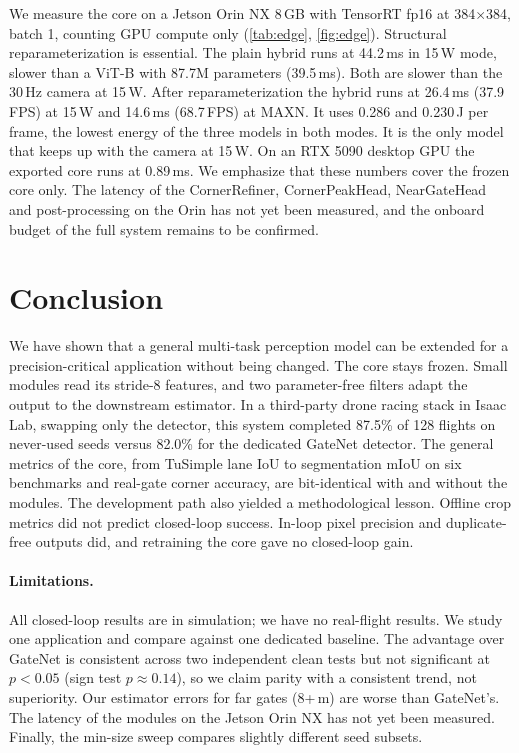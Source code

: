 \documentclass[10pt,twocolumn,letterpaper]{article}
\begin{document}
We measure the core on a Jetson Orin NX 8\,GB with TensorRT fp16 at 384$\times$384, batch 1, counting GPU compute only (\cref{tab:edge}, \cref{fig:edge}). Structural reparameterization is essential. The plain hybrid runs at 44.2\,ms in 15\,W mode, slower than a ViT-B with 87.7M parameters (39.5\,ms). Both are slower than the 30\,Hz camera at 15\,W. After reparameterization the hybrid runs at 26.4\,ms (37.9\,FPS) at 15\,W and 14.6\,ms (68.7\,FPS) at MAXN. It uses 0.286 and 0.230\,J per frame, the lowest energy of the three models in both modes. It is the only model that keeps up with the camera at 15\,W. On an RTX 5090 desktop GPU the exported core runs at 0.89\,ms. We emphasize that these numbers cover the frozen core only. The latency of the CornerRefiner, CornerPeakHead, NearGateHead and post-processing on the Orin has not yet been measured, and the onboard budget of the full system remains to be confirmed.

\section{Conclusion}
\label{sec:conclusion}
We have shown that a general multi-task perception model can be extended for a precision-critical application without being changed. The core stays frozen. Small modules read its stride-8 features, and two parameter-free filters adapt the output to the downstream estimator. In a third-party drone racing stack in Isaac Lab, swapping only the detector, this system completed 87.5\% of 128 flights on never-used seeds versus 82.0\% for the dedicated GateNet detector. The general metrics of the core, from TuSimple lane IoU to segmentation mIoU on six benchmarks and real-gate corner accuracy, are bit-identical with and without the modules. The development path also yielded a methodological lesson. Offline crop metrics did not predict closed-loop success. In-loop pixel precision and duplicate-free outputs did, and retraining the core gave no closed-loop gain.

\paragraph{Limitations.}
All closed-loop results are in simulation; we have no real-flight results. We study one application and compare against one dedicated baseline. The advantage over GateNet is consistent across two independent clean tests but not significant at $p<0.05$ (sign test $p\approx0.14$), so we claim parity with a consistent trend, not superiority. Our estimator errors for far gates (8+\,m) are worse than GateNet's. The latency of the modules on the Jetson Orin NX has not yet been measured. Finally, the min-size sweep compares slightly different seed subsets.
\end{document}
